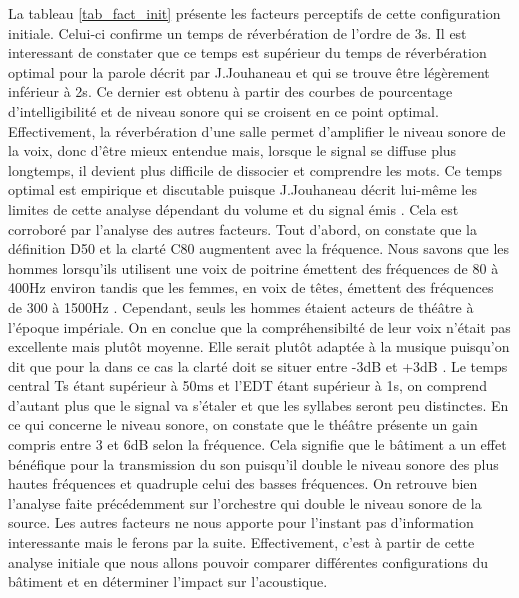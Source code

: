 La tableau \ref{tab_fact_init} présente les facteurs perceptifs de cette configuration initiale. Celui-ci confirme un temps de réverbération de l'ordre de 3s. Il est interessant de constater que ce temps est supérieur du temps de réverbération optimal pour la parole décrit par J.Jouhaneau \cite[p.209]{jouhaneau} et qui se trouve être légèrement inférieur à 2s. Ce dernier est obtenu à partir des courbes de pourcentage d'intelligibilité et de niveau sonore qui se croisent en ce point optimal. Effectivement, la réverbération d'une salle permet d'amplifier le niveau sonore de la voix, donc d'être mieux entendue mais, lorsque le signal se diffuse plus longtemps, il devient plus difficile de dissocier et comprendre les mots. Ce temps optimal est empirique et discutable puisque J.Jouhaneau décrit lui-même les limites de cette analyse dépendant du volume et du signal émis \cite[p.218]{jouhaneau}. Cela est corroboré par l'analyse des autres facteurs. Tout d'abord, on constate que la définition \gls{D50} et la clarté \gls{C80} augmentent avec la fréquence. Nous savons que les hommes lorsqu'ils utilisent une voix de poitrine émettent des fréquences de 80 à 400Hz environ tandis que les femmes, en voix de têtes, émettent des fréquences de 300 à 1500Hz \cite[Mécanismes vocaux]{voix}. Cependant, seuls les hommes étaient acteurs de théâtre à l'époque impériale. On en conclue que la compréhensibilté de leur voix n'était pas excellente mais plutôt moyenne. Elle serait plutôt adaptée à la musique puisqu'on dit que pour la dans ce cas la clarté doit se situer entre -3dB et +3dB \cite[p.59]{acoustique}. Le temps central \gls{Ts} étant supérieur à 50ms et l'\gls{EDT} étant supérieur à 1s, on comprend d'autant plus que le signal va s'étaler et que les syllabes seront peu distinctes. En ce qui concerne le niveau sonore, on constate que le théâtre présente un gain compris entre 3 et 6dB selon la fréquence. Cela signifie que le bâtiment a un effet bénéfique pour la transmission du son puisqu'il double le niveau sonore des plus hautes fréquences et quadruple celui des basses fréquences. On retrouve bien l'analyse faite précédemment sur l'orchestre qui double le niveau sonore de la source. Les autres facteurs ne nous apporte pour l'instant pas d'information interessante mais le ferons par la suite. Effectivement, c'est à partir de cette analyse initiale que nous allons pouvoir comparer différentes configurations du bâtiment et en déterminer l'impact sur l'acoustique.
% 

